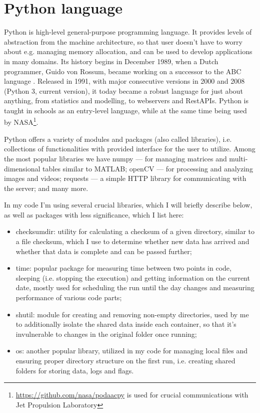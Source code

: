 \section{Python language}
Python is high-level general-purpose programming language. It provides levels of abstraction from the machine architecture, so that user doesn't have to worry about e.g. managing memory allocation, and can be used to develop applications in many domains. Its history begins in December 1989, when a Dutch programmer, Guido von Rossum, became working on a successor to the ABC language \cite{thePython}. Released in 1991, with major consecutive versions in 2000 and 2008 (Python 3, current version), it today became a robust language for just about anything, from statistics and modelling, to webservers and RestAPIs. Python is taught in schools as an entry-level language, while at the same time being used by NASA\footnote{\url{https://github.com/nasa/podaacpy} is used for crucial communications with Jet Propulsion Laboratory}. \par
Python offers a variety of modules and packages (also called libraries), i.e. collections of functionalities with provided interface for the user to utilize. Among the most popular libraries we have numpy --- for managing matrices and multi-dimensional tables similar to MATLAB; openCV --- for processing and analyzing images and videos; requests --- a simple HTTP library for communicating with the server; and many more. \par
In my code I'm using several crucial libraries, which I will briefly describe below, as well as packages with less significance, which I list here:

\begin{itemize}
    \item checksumdir: utility for calculating a checksum of a given directory, similar to a file checksum, which I use to determine whether new data has arrived and whether that data is complete and can be passed further;
    \item time: popular package for measuring time between two points in code, sleeping (i.e. stopping the execution) and getting information on the current date, mostly used for scheduling the run until the day changes and measuring performance of various code parts;
    \item shutil: module for creating and removing non-empty directories, used by me to additionally isolate the shared data inside each container, so that it's invulnerable to changes in the original folder once running;
    \item os: another popular library, utilized in my code for managing local files and ensuring proper directory structure on the first run, i.e. creating shared folders for storing data, logs and flags.
\end{itemize}

